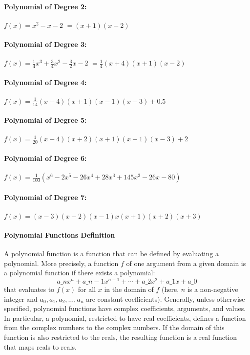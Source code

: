 \paragraph{Polynomial of Degree 2:}
$
f(x) = x^2 - x - 2
$
$
= (x + 1)(x - 2)
$

\paragraph{Polynomial of Degree 3:}
$
f(x) = \frac{1}{4}x^3 + \frac{3}{4}x^2 - \frac{3}{2}x - 2
$
$
= \frac{1}{4} (x + 4)(x + 1)(x - 2)
$

\paragraph{Polynomial of Degree 4:}
$
f(x) = \frac{1}{14} (x + 4)(x + 1)(x - 1)(x - 3) + 0.5
$

\paragraph{Polynomial of Degree 5:}
$
f(x) = \frac{1}{20} (x + 4)(x + 2)(x + 1)(x - 1)(x - 3) + 2
$

\paragraph{Polynomial of Degree 6:}
$
f(x) = \frac{1}{100} (x^6 - 2x^5 - 26x^4 + 28x^3 + 145x^2 - 26x - 80)
$

\paragraph{Polynomial of Degree 7:}
$
f(x) = (x - 3)(x - 2)(x - 1)x(x + 1)(x + 2)(x + 3)
$

\paragraph{Polynomial Functions Definition}

A polynomial function is a function that can be defined by evaluating a polynomial. More precisely, a function $f$ of one argument from a given domain is a polynomial function if there exists a polynomial:
$$
a\_n x^n + a\_{n-1} x^{n-1} + \cdots + a\_2 x^2 + a\_1 x + a\_0
$$
that evaluates to $f(x)$ for all $x$ in the domain of $f$ (here, $n$ is a non-negative integer and $a_0, a_1, a_2, \ldots, a_n$ are constant coefficients). Generally, unless otherwise specified, polynomial functions have complex coefficients, arguments, and values. In particular, a polynomial, restricted to have real coefficients, defines a function from the complex numbers to the complex numbers. If the domain of this function is also restricted to the reals, the resulting function is a real function that maps reals to reals.

